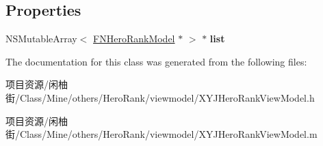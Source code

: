 \subsection*{Properties}
\begin{DoxyCompactItemize}
\item 
\mbox{\label{interface_x_y_j_hero_rank_view_model_ad9697bca22d3495507f0853f1f757f7b}} 
N\+S\+Mutable\+Array$<$ \mbox{\hyperlink{interface_f_n_hero_rank_model}{F\+N\+Hero\+Rank\+Model}} $\ast$ $>$ $\ast$ {\bfseries list}
\end{DoxyCompactItemize}


The documentation for this class was generated from the following files\+:\begin{DoxyCompactItemize}
\item 
项目资源/闲柚街/\+Class/\+Mine/others/\+Hero\+Rank/viewmodel/X\+Y\+J\+Hero\+Rank\+View\+Model.\+h\item 
项目资源/闲柚街/\+Class/\+Mine/others/\+Hero\+Rank/viewmodel/X\+Y\+J\+Hero\+Rank\+View\+Model.\+m\end{DoxyCompactItemize}

